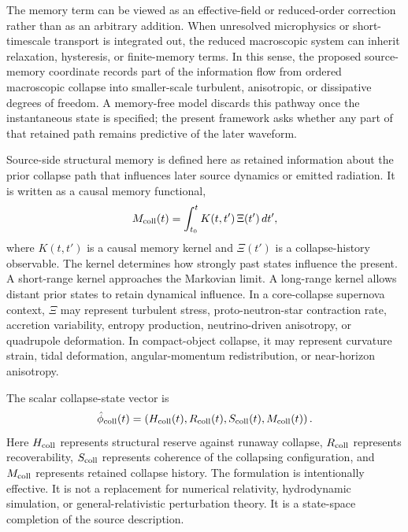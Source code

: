 \documentclass[11pt]{article}
\begin{document}
The memory term can be viewed as an effective-field or reduced-order correction rather than as an arbitrary addition. When unresolved microphysics or short-timescale transport is integrated out, the reduced macroscopic system can inherit relaxation, hysteresis, or finite-memory terms. In this sense, the proposed source-memory coordinate records part of the information flow from ordered macroscopic collapse into smaller-scale turbulent, anisotropic, or dissipative degrees of freedom. A memory-free model discards this pathway once the instantaneous state is specified; the present framework asks whether any part of that retained path remains predictive of the later waveform.

Source-side structural memory is defined here as retained information about the prior collapse path that influences later source dynamics or emitted radiation. It is written as a causal memory functional,
\begin{equation}
M_{\rm coll}(t)=\int_{t_0}^{t}K(t,t')\,\Xi(t')\,dt',
\label{eq:memory_kernel}
\end{equation}
where \(K(t,t')\) is a causal memory kernel and \(\Xi(t')\) is a collapse-history observable. The kernel determines how strongly past states influence the present. A short-range kernel approaches the Markovian limit. A long-range kernel allows distant prior states to retain dynamical influence. In a core-collapse supernova context, \(\Xi\) may represent turbulent stress, proto-neutron-star contraction rate, accretion variability, entropy production, neutrino-driven anisotropy, or quadrupole deformation. In compact-object collapse, it may represent curvature strain, tidal deformation, angular-momentum redistribution, or near-horizon anisotropy.

The scalar collapse-state vector is
\begin{equation}
\hat{\phi}_{\rm coll}(t)=\left(H_{\rm coll}(t),R_{\rm coll}(t),S_{\rm coll}(t),M_{\rm coll}(t)\right).
\label{eq:collapse_vector}
\end{equation}
Here \(H_{\rm coll}\) represents structural reserve against runaway collapse, \(R_{\rm coll}\) represents recoverability, \(S_{\rm coll}\) represents coherence of the collapsing configuration, and \(M_{\rm coll}\) represents retained collapse history. The formulation is intentionally effective. It is not a replacement for numerical relativity, hydrodynamic simulation, or general-relativistic perturbation theory. It is a state-space completion of the source description.
\end{document}
